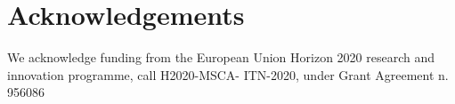 \documentclass{webofc}
\begin{document}














\section*{Acknowledgements}
We acknowledge funding from the European Union Horizon 2020 research and innovation programme, call H2020-MSCA- ITN-2020, under Grant Agreement n. 956086


\end{document}
